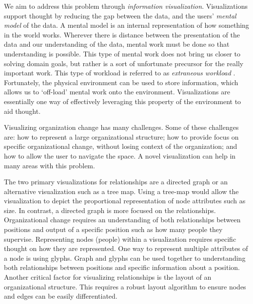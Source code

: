 \documentclass{soups}
\begin{document}
We aim to address this problem through \emph{information visualization}. Visualizations support thought by reducing the gap between the data, and the users' \emph{mental model} of the data\cite{yi2007toward}. A mental model is an internal representation of how something in the world works\cite{staggersmodel,norman2014some}. Wherever there is distance between the presentation of the data and our understanding of the data, mental work must be done so that understanding is possible. This type of mental work does not bring us closer to solving domain goals, but rather is a sort of unfortunate precursor for the really important work. This type of workload is referred to as \emph{extraneous workload} \cite{paas2003cognitive}. Fortunately, the physical environment can be used to store information, which allows us to \lq off-load\rq{} mental work onto the environment\cite{wilson2002six}. Visualizations are essentially one way of effectively leveraging this property of the environment to aid thought. 

Visualizing organization change has many challenges. Some of these challenges are: how to represent a large organizational structure; how to provide focus on specific organizational change, without losing context of the organization; and how to allow the user to navigate the space.  A novel visualization can help in many areas with this problem.

The two primary visualizations for relationships are a directed graph or an alternative visualization such as a tree map.  Using a tree-map would allow the visualization to depict the proportional representation of node attributes such as size\cite{shneiderman1992tree}.  In contrast, a directed graph is more focused on the relationships.  Organizational change requires an understanding of both relationships between positions and output of a specific position such as how many people they supervise.  Representing nodes (people) within a visualization requires specific thought on how they are represented.  One way to represent multiple attributes of a node is using glyphs\cite[chapter 5]{ware2012information}.  Graph and glyphs can be used together to understanding both relationships between positions and specific information about a position.  Another critical factor for visualizing relationships is the layout of an organizational structure.  This requires a robust layout algorithm to ensure nodes and edges can be easily differentiated\cite{herman2000graph}.  
\end{document}
